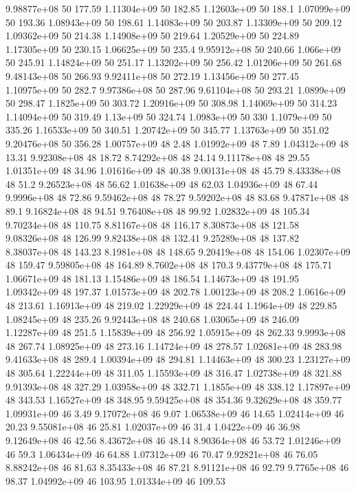 9.98877e+08 50 177.59
1.11304e+09 50 182.85
1.12603e+09 50 188.1
1.07099e+09 50 193.36
1.08943e+09 50 198.61
1.14083e+09 50 203.87
1.13309e+09 50 209.12
1.09362e+09 50 214.38
1.14908e+09 50 219.64
1.20529e+09 50 224.89
1.17305e+09 50 230.15
1.06625e+09 50 235.4
9.95912e+08 50 240.66
1.066e+09 50 245.91
1.14824e+09 50 251.17
1.13202e+09 50 256.42
1.01206e+09 50 261.68
9.48143e+08 50 266.93
9.92411e+08 50 272.19
1.13456e+09 50 277.45
1.10975e+09 50 282.7
9.97386e+08 50 287.96
9.61104e+08 50 293.21
1.0899e+09 50 298.47
1.1825e+09 50 303.72
1.20916e+09 50 308.98
1.14069e+09 50 314.23
1.14094e+09 50 319.49
1.13e+09 50 324.74
1.0983e+09 50 330
1.1079e+09 50 335.26
1.16533e+09 50 340.51
1.20742e+09 50 345.77
1.13763e+09 50 351.02
9.20476e+08 50 356.28
1.00757e+09 48 2.48
1.01992e+09 48 7.89
1.04312e+09 48 13.31
9.92308e+08 48 18.72
8.74292e+08 48 24.14
9.11178e+08 48 29.55
1.01351e+09 48 34.96
1.01616e+09 48 40.38
9.00131e+08 48 45.79
8.43338e+08 48 51.2
9.26523e+08 48 56.62
1.01638e+09 48 62.03
1.04936e+09 48 67.44
9.9996e+08 48 72.86
9.59462e+08 48 78.27
9.59202e+08 48 83.68
9.47871e+08 48 89.1
9.16824e+08 48 94.51
9.76408e+08 48 99.92
1.02832e+09 48 105.34
9.70234e+08 48 110.75
8.81167e+08 48 116.17
8.30873e+08 48 121.58
9.08326e+08 48 126.99
9.82438e+08 48 132.41
9.25289e+08 48 137.82
8.38037e+08 48 143.23
8.1981e+08 48 148.65
9.20419e+08 48 154.06
1.02307e+09 48 159.47
9.59805e+08 48 164.89
8.7602e+08 48 170.3
9.43779e+08 48 175.71
1.06671e+09 48 181.13
1.15486e+09 48 186.54
1.14673e+09 48 191.95
1.09342e+09 48 197.37
1.01573e+09 48 202.78
1.00123e+09 48 208.2
1.0616e+09 48 213.61
1.16913e+09 48 219.02
1.22929e+09 48 224.44
1.1964e+09 48 229.85
1.08245e+09 48 235.26
9.92443e+08 48 240.68
1.03065e+09 48 246.09
1.12287e+09 48 251.5
1.15839e+09 48 256.92
1.05915e+09 48 262.33
9.9993e+08 48 267.74
1.08925e+09 48 273.16
1.14724e+09 48 278.57
1.02681e+09 48 283.98
9.41633e+08 48 289.4
1.00394e+09 48 294.81
1.14463e+09 48 300.23
1.23127e+09 48 305.64
1.22244e+09 48 311.05
1.15593e+09 48 316.47
1.02738e+09 48 321.88
9.91393e+08 48 327.29
1.03958e+09 48 332.71
1.1855e+09 48 338.12
1.17897e+09 48 343.53
1.16527e+09 48 348.95
9.59425e+08 48 354.36
9.32629e+08 48 359.77
1.09931e+09 46 3.49
9.17072e+08 46 9.07
1.06538e+09 46 14.65
1.02414e+09 46 20.23
9.55081e+08 46 25.81
1.02037e+09 46 31.4
1.0422e+09 46 36.98
9.12649e+08 46 42.56
8.43672e+08 46 48.14
8.90364e+08 46 53.72
1.01246e+09 46 59.3
1.06434e+09 46 64.88
1.07312e+09 46 70.47
9.92821e+08 46 76.05
8.88242e+08 46 81.63
8.35433e+08 46 87.21
8.91121e+08 46 92.79
9.7765e+08 46 98.37
1.04992e+09 46 103.95
1.01334e+09 46 109.53
